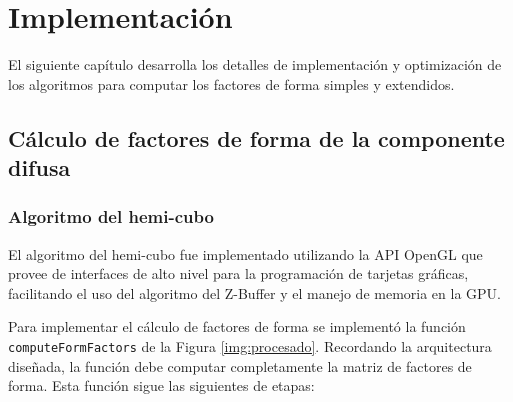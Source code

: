 \chapter{Implementación}
\label{ch:chap04}

El siguiente capítulo desarrolla los detalles de implementación y optimización de los algoritmos para computar los factores de forma simples y extendidos.

\section{Cálculo de factores de forma de la componente difusa}
\label{sec:dif-impl}

\subsection{Algoritmo del hemi-cubo}

El algoritmo del hemi-cubo fue implementado utilizando la API OpenGL que provee de interfaces de alto nivel para la programación de tarjetas gráficas, facilitando el uso del algoritmo del Z-Buffer y el manejo de memoria en la GPU.

Para implementar el cálculo de factores de forma se implementó la función \verb|computeFormFactors| de la Figura \ref{img:procesado}. Recordando la arquitectura diseñada, la función debe computar completamente la matriz de factores de forma. Esta función sigue las siguientes de etapas:

